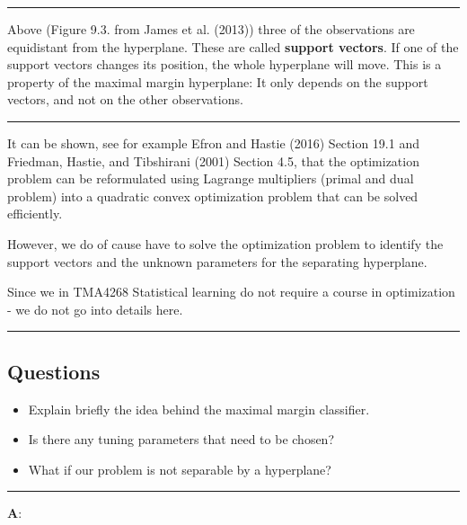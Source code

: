 \documentclass[]{article}
\providecommand{\tightlist}{%
  \setlength{\itemsep}{0pt}\setlength{\parskip}{0pt}}
\begin{document}
\begin{center}\rule{0.5\linewidth}{\linethickness}\end{center}

Above (Figure 9.3. from James et al. (2013)) three of the observations
are equidistant from the hyperplane. These are called \textbf{support
vectors}. If one of the support vectors changes its position, the whole
hyperplane will move. This is a property of the maximal margin
hyperplane: It only depends on the support vectors, and not on the other
observations.

\begin{center}\rule{0.5\linewidth}{\linethickness}\end{center}

It can be shown, see for example Efron and Hastie (2016) Section 19.1
and Friedman, Hastie, and Tibshirani (2001) Section 4.5, that the
optimization problem can be reformulated using Lagrange multipliers
(primal and dual problem) into a quadratic convex optimization problem
that can be solved efficiently.

However, we do of cause have to solve the optimization problem to
identify the support vectors and the unknown parameters for the
separating hyperplane.

Since we in TMA4268 Statistical learning do not require a course in
optimization - we do not go into details here.

\begin{center}\rule{0.5\linewidth}{\linethickness}\end{center}

\hypertarget{questions}{%
\subsection{Questions}\label{questions}}

\begin{itemize}
\tightlist
\item
  Explain briefly the idea behind the maximal margin classifier.
\item
  Is there any tuning parameters that need to be chosen?
\item
  What if our problem is not separable by a hyperplane?
\end{itemize}

\begin{center}\rule{0.5\linewidth}{\linethickness}\end{center}

\textbf{A}:
\end{document}
